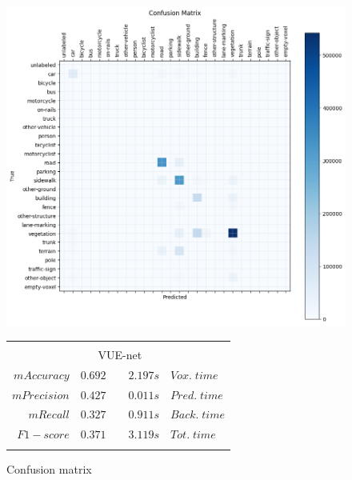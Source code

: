 \begin{figure}[ht]
    \centering
    \begin{minipage}{0.45\textwidth}
        \centering
        \includegraphics[width=\textwidth]{images/confusion_matrix.png}
        \caption{Confusion matrix}
        \label{fig:matrix}
    \end{minipage}\hfill
    \begin{minipage}{0.45\textwidth}
        \centering
        \begin{tabular}{r|c|c|c|l}
            \multicolumn{5}{c}{\rule[-0.4cm]{0pt}{1.2cm}}  \\
            \multicolumn{1}{c}{} & \multicolumn{3}{c}{\rule[-0.4cm]{0pt}{1cm} VUE-net} & \multicolumn{1}{c}{} \\ \cline{2-2} \cline{4-4}
            $mAccuracy$  & \rule[-0.4cm]{0pt}{1cm} $0.692$ & & $2.197s$ & $Vox.\;time$   \\ \cline{2-2} \cline{4-4}
            $mPrecision$ & \rule[-0.4cm]{0pt}{1cm} $0.427$ & & $0.011s$ & $Pred.\;time$  \\ \cline{2-2} \cline{4-4}
            $mRecall$    & \rule[-0.4cm]{0pt}{1cm} $0.327$ & & $0.911s$ & $Back.\;time$  \\ \cline{2-2} \cline{4-4}
            $F1-score$   & \rule[-0.4cm]{0pt}{1cm} $0.371$ & & $3.119s$ & $Tot.\;time$ \\ \cline{2-2} \cline{4-4}
            \multicolumn{5}{c}{\rule[-0.4cm]{0pt}{1.2cm}}  \\
        \end{tabular}
        \label{tab:metrics}
    \end{minipage}
\end{figure}


